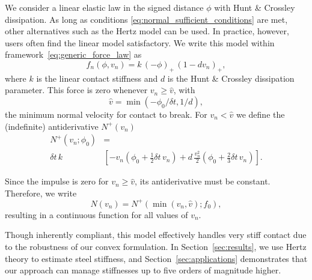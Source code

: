 We consider a linear elastic law in the signed distance $\phi$ with Hunt \&
Crossley~\cite{bib:hunt_crossley} dissipation. As long as conditions
\eqref{eq:normal_sufficient_conditions} are met, other alternatives such as the
Hertz model can be used. In practice, however, users often find the linear model
satisfactory. We write this model within framework~\eqref{eq:generic_force_law}
as
\begin{equation}
    f_n(\phi, v_n) = k\,(-\phi)_+\,(1-dv_n)_+,
    \label{eq:linear_compliance_with_hunt_crossley}
\end{equation}
where $k$ is the linear contact stiffness and $d$ is the Hunt \&
Crossley dissipation parameter. This force is zero whenever $v_n \ge \hat{v}$,
with
\begin{equation}
    \hat{v}=\min(-\phi_0/\delta t, 1/d),
    \label{eq:breaking_velocity}
\end{equation}
the minimum normal velocity for contact to break. For $v_n < \hat{v}$ we define
the (indefinite) antiderivative $N^+(v_n)$
\begin{align*}
    N^+(v_n; \phi_0) &= \\
    \delta t\,k\,&\left[-v_n\left(\phi_0 + \frac{1}{2}\delta t\,v_n\right) + d\,\frac{v_n^2}{2}\left(\phi_0 + \frac{2}{3}\delta t\,v_n\right)\right].
\end{align*}


Since the impulse is zero for $v_n \ge \hat{v}$, its antiderivative must be
constant. Therefore, we write
\begin{equation*}
    N(v_n) = N^+(\min(v_n, \hat{v}); f_{0}),
\end{equation*}
resulting in a continuous function for all values of $v_n$.

Though inherently compliant, this model effectively handles very stiff contact
due to the robustness of our convex formulation. In Section~\ref{sec:results},
we use Hertz theory to estimate steel stiffness, and
Section~\ref{sec:applications} demonstrates that our approach can manage
stiffnesses up to five orders of magnitude higher.

